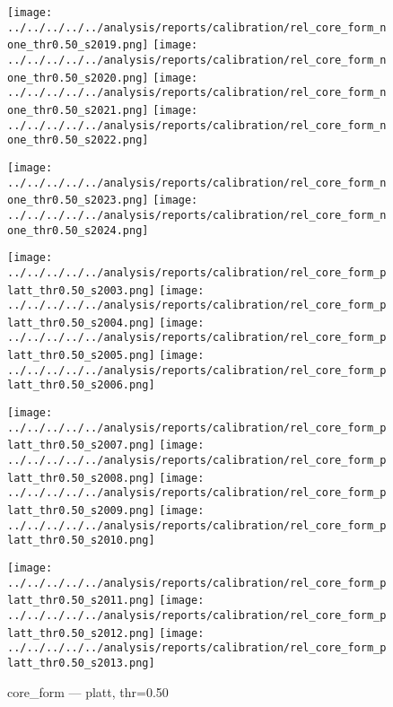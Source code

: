 \begin{figure}[t]
\begin{minipage}[t]{0.49\linewidth}
    \texttt{[image: ../../../../../analysis/reports/calibration/rel\_core\_form\_none\_thr0.50\_s2019.png]}
    \texttt{[image: ../../../../../analysis/reports/calibration/rel\_core\_form\_none\_thr0.50\_s2020.png]}
    \texttt{[image: ../../../../../analysis/reports/calibration/rel\_core\_form\_none\_thr0.50\_s2021.png]}
    \texttt{[image: ../../../../../analysis/reports/calibration/rel\_core\_form\_none\_thr0.50\_s2022.png]}
    \par\vspace{2pt}
    \texttt{[image: ../../../../../analysis/reports/calibration/rel\_core\_form\_none\_thr0.50\_s2023.png]}
    \texttt{[image: ../../../../../analysis/reports/calibration/rel\_core\_form\_none\_thr0.50\_s2024.png]}
  \end{minipage}\hfill
  \begin{minipage}[t]{0.49\linewidth}
    \caption*{\footnotesize core_form — platt, thr=0.50}
    \texttt{[image: ../../../../../analysis/reports/calibration/rel\_core\_form\_platt\_thr0.50\_s2003.png]}
    \texttt{[image: ../../../../../analysis/reports/calibration/rel\_core\_form\_platt\_thr0.50\_s2004.png]}
    \texttt{[image: ../../../../../analysis/reports/calibration/rel\_core\_form\_platt\_thr0.50\_s2005.png]}
    \texttt{[image: ../../../../../analysis/reports/calibration/rel\_core\_form\_platt\_thr0.50\_s2006.png]}
    \par\vspace{2pt}
    \texttt{[image: ../../../../../analysis/reports/calibration/rel\_core\_form\_platt\_thr0.50\_s2007.png]}
    \texttt{[image: ../../../../../analysis/reports/calibration/rel\_core\_form\_platt\_thr0.50\_s2008.png]}
    \texttt{[image: ../../../../../analysis/reports/calibration/rel\_core\_form\_platt\_thr0.50\_s2009.png]}
    \texttt{[image: ../../../../../analysis/reports/calibration/rel\_core\_form\_platt\_thr0.50\_s2010.png]}
    \par\vspace{2pt}
    \texttt{[image: ../../../../../analysis/reports/calibration/rel\_core\_form\_platt\_thr0.50\_s2011.png]}
    \texttt{[image: ../../../../../analysis/reports/calibration/rel\_core\_form\_platt\_thr0.50\_s2012.png]}
    \texttt{[image: ../../../../../analysis/reports/calibration/rel\_core\_form\_platt\_thr0.50\_s2013.png]}

\end{minipage}
\end{figure}
